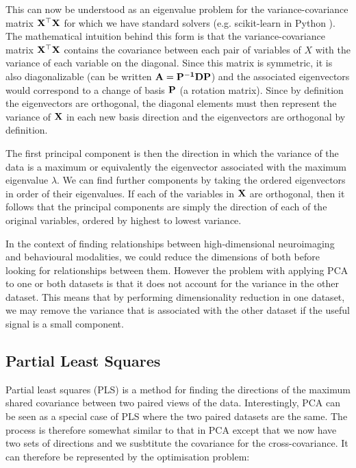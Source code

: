 This can now be understood as an eigenvalue problem for the variance-covariance matrix $\bold{X^{\top}X}$ for which we have standard solvers (e.g. scikit-learn in Python \cite{pedregosa2011scikit}). The mathematical intuition behind this form is that the variance-covariance matrix $\bold{X^{\top}X}$ contains the covariance between each pair of variables of $X$ with the variance of each variable on the diagonal. Since this matrix is symmetric, it is also diagonalizable (can be written $\bold{A=P^{-1}DP}$) and the associated eigenvectors would correspond to a change of basis $\bold{P}$ (a rotation matrix). Since by definition the eigenvectors are orthogonal, the diagonal elements must then represent the variance of $\bold{X}$ in each new basis direction and the eigenvectors are orthogonal by definition. 

The first principal component is then the direction in which the variance of the data is a maximum or equivalently the eigenvector associated with the maximum eigenvalue $\lambda$. We can find further components by taking the ordered eigenvectors in order of their eigenvalues. If each of the variables in $\bold{X}$ are orthogonal, then it follows that the principal components are simply the direction of each of the original variables, ordered by highest to lowest variance.

In the context of finding relationships between high-dimensional neuroimaging and behavioural modalities, we could reduce the dimensions of both before looking for relationships between them. However the problem with applying PCA to one or both datasets is that it does not account for the variance in the other dataset. This means that by performing dimensionality reduction in one dataset, we may remove the variance that is associated with the other dataset if the useful signal is a small component.

\subsection{Partial Least Squares}

Partial least squares (PLS) is a method for finding the directions of the maximum shared covariance between two paired views of the data. Interestingly, PCA can be seen as a special case of PLS where the two paired datasets are the same. The process is therefore somewhat similar to that in PCA except that we now have two sets of directions and we susbtitute the covariance for the cross-covariance. It can therefore be represented by the optimisation problem:

